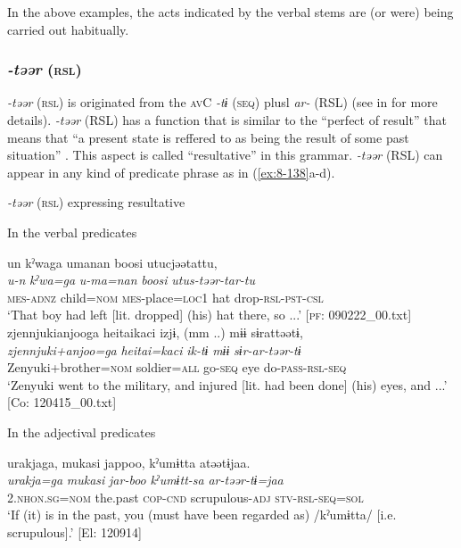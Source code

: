 In the above examples, the acts indicated by the verbal stems are (or were) being carried out habitually.

\subsubsection{\textit{-təər} (\textsc{rsl})}

\textit{-təər} (\textsc{rsl}) is originated from the \textsc{av}C \textit{-tɨ} (\textsc{seq}) plusl \textit{ar-} (RSL) (see  in  for more details). \textit{-təər} (RSL) has a function that is similar to the “perfect of result” that means that “a present state is reffered to as being the result of some past situation” \citep[56]{Comrie1976}. This aspect is called “resultative” in this grammar. \textit{-təər} (RSL) can appear in any kind of predicate phrase as in (\ref{ex:8-138}a-d).

\ea\label{ex:8-138}
  \textit{-təər} (\textsc{rsl}) expressing resultative

  In the verbal predicates

\ea [= (\ref{ex:6-132}a)]

{\TM}
\glll  un  kˀwaga  umanan  {\textbar}boosi{\textbar}  utucjəətattu,\\
\textit{u-n}  \textit{kˀwa=ga}  \textit{u-ma=nan}  \textit{boosi}  \textit{utus-təər-tar-tu}\\
\textsc{mes}-\textsc{adnz}  child=\textsc{nom}  \textsc{mes}-place=\textsc{loc}1  hat  drop-\textsc{rsl}-\textsc{pst}-\textsc{csl}\\
\glt ‘That boy had left [lit. dropped] (his) hat there, so ...’ [\textsc{pf}: 090222\_00.txt]
\ex
{\TM}
\glll  zjennjukianjooga  {\textbar}heitai{\textbar}kaci  izjɨ,  (mm ..)  mɨɨ      sɨrattəətɨ,        \\
\textit{zjennjuki+anjoo=ga}  \textit{heitai=kaci}  \textit{ik-tɨ}    \textit{mɨɨ}      \textit{sɨr-ar-təər-tɨ}\\
Zenyuki+brother=\textsc{nom}  soldier=\textsc{all}  go-\textsc{seq}    eye     do-\textsc{pass}-\textsc{rsl}-\textsc{seq}\\
\glt ‘Zenyuki went to the military, and injured [lit. had been done] (his) eyes, and ...’ [Co: 120415\_00.txt]
\z

  In the adjectival predicates



{\TM}
\glll  urakjaga,  mukasi  jappoo,  kˀumɨtta      atəətɨjaa.\\
\textit{urakja=ga}  \textit{mukasi}  \textit{jar-boo}  \textit{kˀumɨtt-sa}      \textit{ar-təər-tɨ=jaa}\\
2.\textsc{nhon}.\textsc{sg}=\textsc{nom}  the.past  \textsc{cop}-\textsc{cnd}  scrupulous-\textsc{adj}   \textsc{stv}-\textsc{rsl}-\textsc{seq}=\textsc{sol}\\
\glt ‘If (it) is in the past, you (must have been regarded as) /kˀumɨtta/ [i.e. scrupulous].’ [El: 120914]

